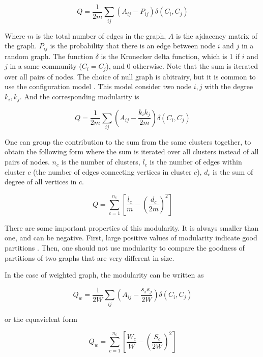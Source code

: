 \begin{equation}
	Q = \frac{1}{2m} \sum_{ij} \left(A_{ij} - P_{ij}\right) \delta(C_i, C_j)
\end{equation}

Where $m$ is the total number of edges in the graph,
$A$ is the ajdacency matrix of the graph.
$P_{ij}$ is the probability that there is an edge between node $i$ and $j$ in a random graph.
The function $\delta$ is the Kronecker delta function,
which is 1 if $i$ and $j$ in a same community ($C_i = C_j$), and 0 otherwise.
Note that the sum is iterated over all pairs of nodes.
The choice of null graph is abitrairy, but it is common to use the configuration model \parencite{newman2004}.
This model consider two node $i, j$ with the degree $k_i, k_j$.
And the corresponding modularity is

\begin{equation}
	Q = \frac{1}{2m} \sum_{ij} \left(A_{ij} - \frac{k_i k_j}{2m}\right) \delta(C_i, C_j)
\end{equation}

One can group the contribution to the sum from the same clusters together,
to obtain the following form where the sum is iterated over all clusters instead of all pairs of nodes.
$n_c$ is the number of clusters, $l_c$ is the number of edges within cluster $c$ (the number of edges connecting vertices in cluster $c$),
$d_c$ is the sum of degree of all vertices in $c$.


\begin{equation}
	Q = \sum_{c=1}^{n_c} \left[\frac{l_c}{m} - \left(\frac{d_c}{2m}\right)^2 \right]
\end{equation}

There are some important properties of this modularity.
It is always smaller than one, and can be negative.
First, large positive values of modularity indicate good partitions \parencite{fortunato2010}.
Then, one should not use modularity to compare the goodness of partitions of two graphs that are very different in size.

In the case of weighted graph, the modularity can be written as

\begin{equation}
	Q_w = \frac{1}{2W} \sum_{ij} \left(A_{ij} - \frac{s_i s_j}{2W}\right) \delta(C_i, C_j)
\end{equation}

or the equavielent form

\begin{equation}
	Q_w = \sum_{c=1}^{n_c} \left[\frac{W_c}{W} - \left(\frac{S_c}{2W}\right)^2 \right]
\end{equation}

